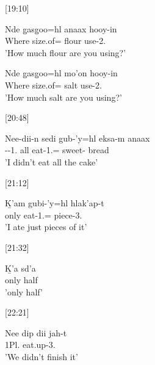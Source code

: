 [19:10]
\begin{exe}
\ex \begin{xlist}
\item \gll Nde g̱asg̱oo=hl anaax hooy-in\\
Where size.of=\Cn{} flour use-2.\Ii{}\\
'How much flour are you using?'
\item \gll Nde g̱asg̱oo=hl mo'on hooy-in\\
Where size.of=\Cn{} salt use-2.\Ii{}\\
'How much salt are you using?'
\end{xlist}
\end{exe}

[20:48]
\begin{exe}
    \ex \gll Nee-dii-n sedi gub-'y=hl eksa-m anaax\\
    \Neg{}-\Foc{}-1.\I{} all eat-1.\Ii{}=\Cn{} sweet-\Attr{} bread\\
'I didn't eat all the cake'
    \end{exe}

[21:12]
\begin{exe}
\ex \gll Ḵ'am gubi-'y=hl hlak'ap-t\\
only eat-1.\Ii{}=\Cn{} piece-3.\Ii{}\\
'I ate just pieces of it'
\end{exe}

[21:32]
\begin{exe}
    \ex \gll Ḵ'a sd'a \\
    only half\\
    'only half'
\end{exe}

[22:21]
    \begin{exe}
    \ex \gll Nee dip dii jah-t \\
\Neg{} 1Pl.\I{} \Foc{} eat.up-3.\Ii{}\\
'We didn't finish it'
    \end{exe}

